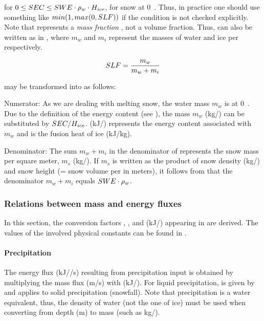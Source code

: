 for $0 \le SEC \le SWE \cdot \rho_{w} \cdot H_{ice}$, \ie{} for snow at 0~\celsius. Thus, in practice one should use something like $min(1,max(0,SLF))$ if the condition is not checked explicitly. Note that \snowFractionLiquid{} represents a \emph{mass fraction} \citep{Tarboton1996}, not a volume fraction. Thus, \snowFractionLiquid{} can also be written as in , where $m_w$ and $m_i$ represent the masses of water and ice per \sqm{} respectively.

\begin{equation} \label{eqn:snow-enBal_energy-fraction-liquid-masses}
  SLF = \frac{m_w}{m_w + m_i}
\end{equation}

 may be transformed into  as follows:

Numerator: As we are dealing with melting snow, the water mass $m_w$ is at 0~\celsius. Due to the definition of the energy content (see ), the mass $m_w$ (kg/\sqm) can be substituted by $SEC/H_{ice}$.  \snowEnergyContent{} (kJ/\sqm) represents the energy content associated with $m_w$ and \fusionHeatIce{} is the fusion heat of ice (kJ/kg).

Denominator: The sum $m_w + m_i$ in the denominator of  represents the snow mass per square meter, $m_s$ (kg/\sqm). If $m_s$ is written as the product of snow density \densitySnow{} (kg/\cbm) and snow height \snowHeight{} (= snow volume per \sqm{} in meters), it follows from  that the denominator $m_w + m_i$ equals $SWE \cdot \rho_{w}$.

\subsubsection{Relations between mass and energy fluxes} \label{sec:snow-enBal_mass-energy-relations}
In this section, the conversion factors \stoifacPrecMassToEnergy, \stoifacSublMassToEnergy, and \stoifacFlowMassToEnergy{} (kJ/\cbm) appearing in  are derived. The values of the involved physical constants can be found in .

\paragraph{Precipitation}
The energy flux (kJ/\sqm/s) resulting from precipitation input is obtained by multiplying the mass flux (m/s) with \stoifacPrecMassToEnergy{} (kJ/\cbm). For liquid precipitation, \stoifacPrecMassToEnergy{} is given by  and  applies to solid precipitation (snowfall). Note that precipitation is a water equivalent, thus, the density of water (not the one of ice) must be used when converting from depth (m) to mass (such as kg/\sqm).

